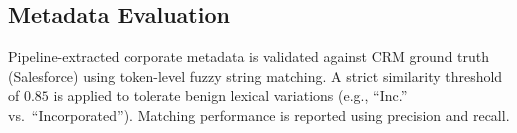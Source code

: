 \subsection{Metadata Evaluation}
\label{app:metadata_eval}

Pipeline-extracted corporate metadata is validated against CRM ground truth (Salesforce) using token-level fuzzy string matching. A strict similarity threshold of $0.85$ is applied to tolerate benign lexical variations (e.g., ``Inc.'' vs.\ ``Incorporated''). Matching performance is reported using precision and recall.



